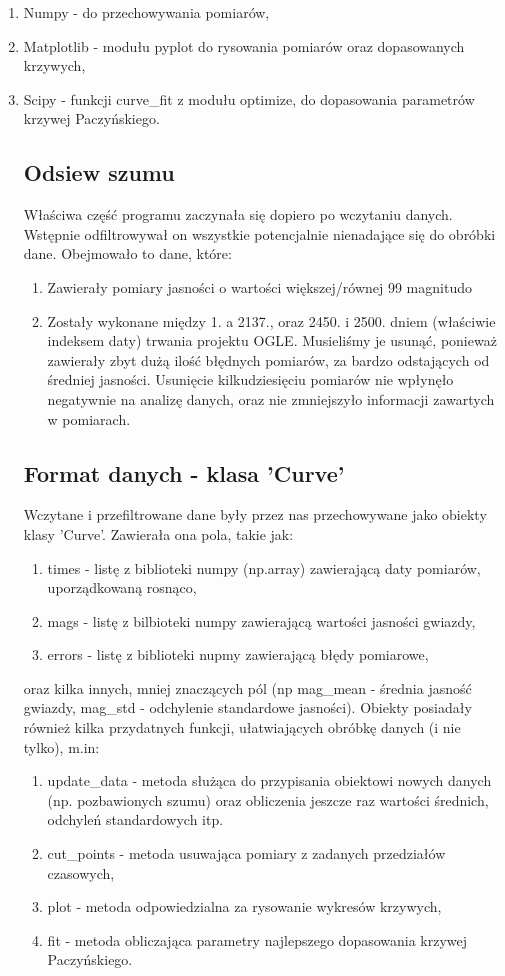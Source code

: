 \documentclass[a4paper,11pt]{article}
\newcommand{\ak}{\hspace{0.7 cm}}
\begin{document}
\begin{enumerate}
	\item Numpy - do przechowywania pomiarów,
	\item Matplotlib - modułu pyplot do rysowania pomiarów oraz dopasowanych krzywych,
	\item Scipy - funkcji curve_fit z modułu optimize, do dopasowania parametrów krzywej Paczyńskiego.
\subsection{Odsiew szumu}
\ak Właściwa część programu zaczynała się dopiero po wczytaniu danych. Wstępnie odfiltrowywał on wszystkie potencjalnie nienadające się do obróbki dane. Obejmowało to dane, które:
\begin{enumerate}
\item Zawierały pomiary jasności o wartości większej/równej 99 magnitudo 
\item Zostały wykonane między 1. a 2137., oraz  2450. i 2500. dniem (właściwie indeksem daty) trwania projektu OGLE. Musieliśmy je usunąć, ponieważ zawierały zbyt dużą ilość błędnych pomiarów, za bardzo odstających od średniej jasności. Usunięcie kilkudziesięciu pomiarów nie wpłynęło negatywnie na analizę danych, oraz nie zmniejszyło informacji zawartych w pomiarach. 
\end{enumerate}

\subsection{Format danych - klasa 'Curve'}
\ak Wczytane i przefiltrowane dane były przez nas przechowywane jako obiekty klasy 'Curve'. Zawierała ona pola, takie jak:
\begin{enumerate}
	\item times - listę z biblioteki numpy (np.array) zawierającą daty pomiarów, uporządkowaną rosnąco,
	\item mags - listę z bilbioteki numpy zawierającą wartości jasności gwiazdy,
	\item errors - listę z biblioteki nupmy zawierającą błędy pomiarowe,
\end{enumerate}
		oraz kilka innych, mniej znaczących pól (np mag_mean - średnia jasność gwiazdy, mag_std - odchylenie standardowe jasności).
Obiekty posiadały również kilka przydatnych funkcji, ułatwiających obróbkę danych (i nie tylko), m.in:
\begin{enumerate}
	\item update_data - metoda służąca do przypisania obiektowi nowych danych (np. pozbawionych szumu) oraz obliczenia jeszcze raz wartości średnich, odchyleń standardowych itp.
	\item cut_points - metoda usuwająca pomiary z zadanych przedziałów czasowych,
	\item plot - metoda odpowiedzialna za rysowanie wykresów krzywych,
	\item fit - metoda obliczająca parametry najlepszego dopasowania krzywej Paczyńskiego.



\end{enumerate}
\end{enumerate}
\end{document}
